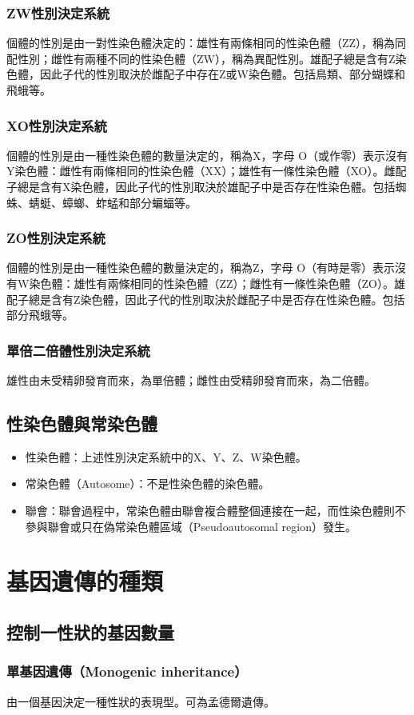 \documentclass[a4paper,12pt]{report}
\begin{document}
\subsubsection{ZW性別決定系統}
個體的性別是由一對性染色體決定的：雄性有兩條相同的性染色體（ZZ），稱為同配性別；雌性有兩種不同的性染色體（ZW），稱為異配性別。雄配子總是含有Z染色體，因此子代的性別取決於雌配子中存在Z或W染色體。包括鳥類、部分蝴蝶和飛蛾等。
\subsubsection{XO性別決定系統}
個體的性別是由一種性染色體的數量決定的，稱為X，字母 O（或作零）表示沒有Y染色體：雌性有兩條相同的性染色體（XX）；雄性有一條性染色體（XO）。雌配子總是含有X染色體，因此子代的性別取決於雄配子中是否存在性染色體。包括蜘蛛、蜻蜓、蟑螂、蚱蜢和部分蝙蝠等。
\subsubsection{ZO性別決定系統}
個體的性別是由一種性染色體的數量決定的，稱為Z，字母 O（有時是零）表示沒有W染色體：雄性有兩條相同的性染色體（ZZ）；雌性有一條性染色體（ZO）。雄配子總是含有Z染色體，因此子代的性別取決於雌配子中是否存在性染色體。包括部分飛蛾等。
\subsubsection{單倍二倍體性別決定系統}
雄性由未受精卵發育而來，為單倍體；雌性由受精卵發育而來，為二倍體。
\subsection{性染色體與常染色體}
\begin{itemize}
\item 性染色體：上述性別決定系統中的X、Y、Z、W染色體。
\item 常染色體（Autosome）：不是性染色體的染色體。
\item 聯會：聯會過程中，常染色體由聯會複合體整個連接在一起，而性染色體則不參與聯會或只在偽常染色體區域（Pseudoautosomal region）發生。
\end{itemize}
\section{基因遺傳的種類}
\subsection{控制一性狀的基因數量}
\subsubsection{單基因遺傳（Monogenic inheritance）}
由一個基因決定一種性狀的表現型。可為孟德爾遺傳。
\end{document}
